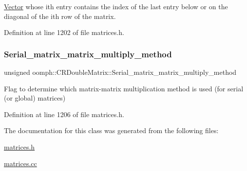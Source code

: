 \hyperlink{classoomph_1_1Vector}{Vector} whose i\textquotesingle{}th entry contains the index of the last entry below or on the diagonal of the i\textquotesingle{}th row of the matrix. 



Definition at line 1202 of file matrices.\+h.

\mbox{\label{classoomph_1_1CRDoubleMatrix_ac8fab9824a0766b6bb6361a6b25df9ce}} 
\subsubsection{\texorpdfstring{Serial\+\_\+matrix\+\_\+matrix\+\_\+multiply\+\_\+method}{Serial\_matrix\_matrix\_multiply\_method}}
{\footnotesize\ttfamily unsigned oomph\+::\+C\+R\+Double\+Matrix\+::\+Serial\+\_\+matrix\+\_\+matrix\+\_\+multiply\+\_\+method\hspace{0.3cm}{\ttfamily [private]}}



Flag to determine which matrix-\/matrix multiplication method is used (for serial (or global) matrices) 



Definition at line 1206 of file matrices.\+h.



The documentation for this class was generated from the following files\+:\begin{DoxyCompactItemize}
\item 
\hyperlink{matrices_8h}{matrices.\+h}\item 
\hyperlink{matrices_8cc}{matrices.\+cc}\end{DoxyCompactItemize}
